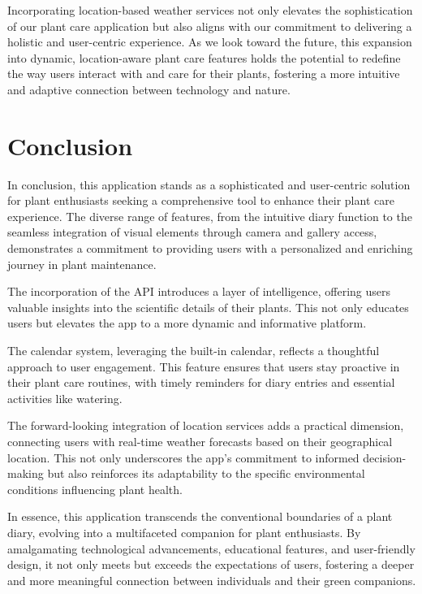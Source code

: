 \documentclass{sigchi}
\begin{document}
Incorporating location-based weather services not only elevates the sophistication of our plant care application but also aligns with our commitment to delivering a holistic and user-centric experience. As we look toward the future, this expansion into dynamic, location-aware plant care features holds the potential to redefine the way users interact with and care for their plants, fostering a more intuitive and adaptive connection between technology and nature.

\section{Conclusion}


In conclusion, this application stands as a sophisticated and user-centric solution for plant enthusiasts seeking a comprehensive tool to enhance their plant care experience. The diverse range of features, from the intuitive diary function to the seamless integration of visual elements through camera and gallery access, demonstrates a commitment to providing users with a personalized and enriching journey in plant maintenance.

The incorporation of the API introduces a layer of intelligence, offering users valuable insights into the scientific details of their plants. This not only educates users but elevates the app to a more dynamic and informative platform.

The calendar system,  leveraging the built-in calendar, reflects a thoughtful approach to user engagement. This feature ensures that users stay proactive in their plant care routines, with timely reminders for diary entries and essential activities like watering.

The forward-looking integration of location services adds a practical dimension, connecting users with real-time weather forecasts based on their geographical location. This not only underscores the app's commitment to informed decision-making but also reinforces its adaptability to the specific environmental conditions influencing plant health.

In essence, this application transcends the conventional boundaries of a plant diary, evolving into a multifaceted companion for plant enthusiasts. By amalgamating technological advancements, educational features, and user-friendly design, it not only meets but exceeds the expectations of users, fostering a deeper and more meaningful connection between individuals and their green companions.
\end{document}
